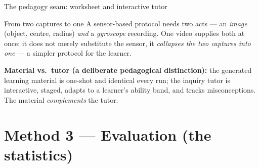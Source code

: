 \documentclass[aspectratio=169,10pt]{beamer}
\begin{document}
\begin{frame}{The pedagogy seam: worksheet and interactive tutor}
\centering
{}
\vspace{0.6em}
\begin{exampleblock}{\small From two captures to one}
{\small A sensor-based protocol needs \alert{two} acts --- an \emph{image} (object, centre, radius)
\emph{and} a \emph{gyroscope} recording. One video supplies \alert{both at once}:
it does not merely substitute the sensor, it \emph{collapses the two captures into one} --- a simpler protocol for the learner.}
\end{exampleblock}
\vspace{0.3em}
{\footnotesize \textbf{Material vs.\ tutor (a deliberate pedagogical distinction):}
the generated learning material is one-shot and identical every run; the inquiry tutor is interactive,
staged, adapts to a learner's ability band, and tracks misconceptions. The material \emph{complements} the tutor.}
\end{frame}

\section{Method 3 --- Evaluation (the statistics)}
\end{document}
